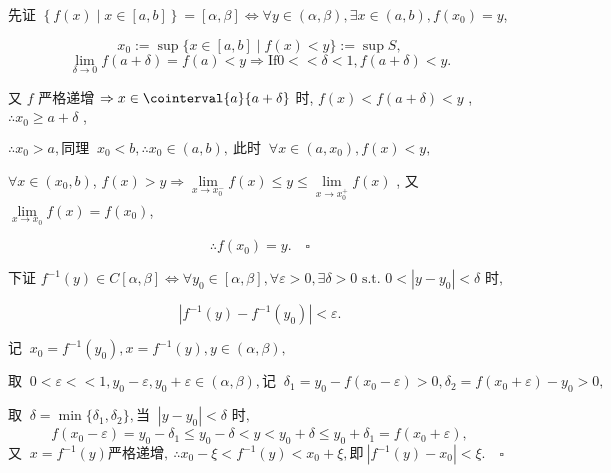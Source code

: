 \documentclass[UTF8]{ctexart}
\begin{document}
			\begin{prf}
			先证 \(\left\{f(x) \mid x \in [a, b]\right\} = \left[\alpha, \beta\right] \Leftrightarrow \forall y \in (\alpha, \beta), \exists x \in (a, b), f(x_0) = y\),


                 \[x_0 := \sup\{x \in [a, b] \mid f(x) < y\} := \sup S,\] 
                 \[
                \lim\limits_{\delta \to 0} f(a + \delta) = f(a) < y \Rightarrow \text{If}  0 << \delta < 1, f(a + \delta) < y.
                \] 

                又 \(f\) 严格递增 \(\Rightarrow x \in\cointerval{a}{a+\delta}\) 时,  \(f(x) < f(a+\delta) < y\) ,  \(\therefore x_0 \geq a + \delta\) , 

                 \(
                \therefore x_0 > a, \text{同理 }\  x_0 < b, \therefore x_0 \in (a, b), \ \text{此时 }\  \forall x \in (a, x_0), f(x) < y,
                \)

                \(\forall x \in (x_0, b)\),  \(f(x) > y \Rightarrow \lim\limits_{x \to x_0^-} f(x) \leq y \leq \lim\limits_{x \to x_0^+} f(x)\) , 又 \(\lim\limits_{x \to x_0} f(x) = f(x_0)\), 

                \[
                \therefore f(x_0) = y. \quad \square
                \] 

                下证 \(f^{-1}(y) \in C[\alpha, \beta] \Leftrightarrow \forall y_0 \in [\alpha, \beta], \forall \varepsilon > 0, \exists \delta > 0 \text{ s.t. } 0 < |y - y_0| < \delta \text{ 时},\)


                 \[
                |f^{-1}(y) - f^{-1}(y_0)| < \varepsilon. \] 

                \(\text{记 }\  x_0 = f^{-1}(y_0), x = f^{-1}(y), y \in (\alpha, \beta),
                \)



                \(\text{取 }\  0 < \varepsilon << 1, y_0 - \varepsilon, y_0 + \varepsilon \in (\alpha, \beta), \text{记 }\  \delta_1 = y_0 - f(x_0 - \varepsilon) > 0, \delta_2 = f(x_0 + \varepsilon) - y_0 > 0,\)



 
                \(\text{取 }\  \delta = \min\{\delta_1, \delta_2\}, \text{当 }\  |y - y_0| < \delta \text{ 时},\)
                \[f(x_0 - \varepsilon) = y_0 - \delta_1 \leq y_0 - \delta < y < y_0 + \delta \leq y_0 + \delta_1 = f(x_0 + \varepsilon),\]
                 \(
                \text{又 }\  x = f^{-1}(y) \text{严格递增},\  \therefore x_0 - \xi < f^{-1}(y) < x_0 + \xi, \text{即}\  |f^{-1}(y) - x_0| < \xi. \quad \square
                \) 
			\end{prf}
\end{document}
